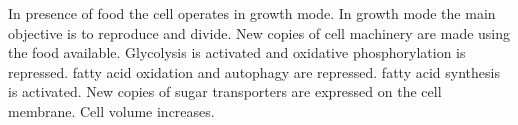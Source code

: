 In presence of food the cell operates in growth mode. In growth mode the main objective is to reproduce and divide. New copies of cell machinery are made using the food available. Glycolysis is activated and oxidative phosphorylation is repressed. fatty acid oxidation and autophagy are repressed. fatty acid synthesis is activated. New copies of sugar transporters are expressed on the cell membrane. Cell volume increases.